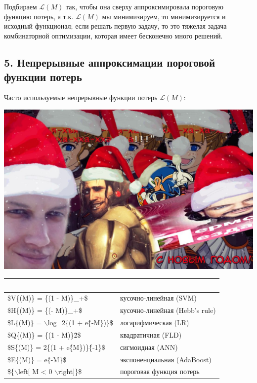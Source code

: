 Подбираем $\mathscr{L}{(M)}$ так, чтобы она сверху аппроксимировала
пороговую
функцию потерь, а т.к. $\mathscr{L}{(M)}$ мы минимизируем, то минимизируется
и исходный функционал;
если решать первую задачу, то это тяжелая задача комбинаторной оптимизации,
которая имеет бесконечно много решений.

\subsection{5. Непрерывные аппроксимации пороговой функции потерь}

Часто используемые непрерывные функции потерь $\mathscr{L}{(M)}$:

\includegraphics[scale=0.3]{figures/samplefigure.jpg}

\begin{table}[!h]
    \centering
    \begin{tabular}{|l|l|}
    \hline
        ~ & ~ \\ \hline
        \$V\{(M)\} = \{(1 - M)\}\_+\$ & кусочно-линейная (SVM) \\ \hline
        \$H\{(M)\} = \{(- M)\}\_+\$ & кусочно-линейная (Hebb's rule) \\ \hline
        \$L\{(M)\} = $\backslash$log\_2\{(1 + e\^\{-M\})\}\$ & логарифмическая (LR) \\ \hline
        \$Q\{(M)\} = \{(1 - M)\}\^2\$ & квадратичная (FLD) \\ \hline
        \$S\{(M)\} = 2\{(1 + e\^\{M\})\}\^\{-1\}\$ & сигмоидная (ANN) \\ \hline
        \$E\{(M)\} = e\^\{-M\}\$ & экспоненциальная (AdaBoost) \\ \hline
        \$\{$\backslash$left[ M < 0 $\backslash$right]\}\$ & пороговая функция потерь \\ \hline
    \end{tabular}
\end{table}

